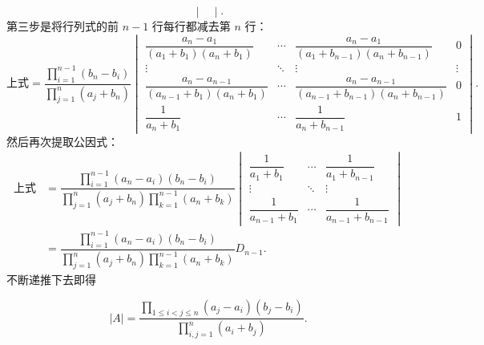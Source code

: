 \documentclass[UTF8,12pt,a4paper,fontset=fandol]{ctexart}
\begin{document}
\begin{solve}
\[\begin{vmatrix}
        \end{vmatrix}. \]
    第三步是将行列式的前 $n-1$ 行每行都减去第 $n$ 行：
    \[ \text{上式} = \dfrac{\prod\limits_{i=1}^{n-1}(b_n-b_i)}{\prod\limits_{j=1}^{n}(a_j+b_n)}
        \begin{vmatrix}
            \dfrac{a_n-a_1}{(a_1+b_1)(a_n+b_1)}         & \cdots & \dfrac{a_n-a_1}{(a_1+b_{n-1})(a_n+b_{n-1})}         & 0      \\[2ex]
            \vdots                                      & \ddots & \vdots                                              & \vdots \\[2ex]
            \dfrac{a_n-a_{n-1}}{(a_{n-1}+b_1)(a_n+b_1)} & \cdots & \dfrac{a_n-a_{n-1}}{(a_{n-1}+b_{n-1})(a_n+b_{n-1})} & 0      \\[2ex]
            \dfrac{1}{a_n+b_1}                          & \cdots & \dfrac{1}{a_n+b_{n-1}}                              & 1
        \end{vmatrix}. \]
    然后再次提取公因式：
    \begin{align*}
        \text{上式} & = \dfrac{\prod\limits_{i=1}^{n-1}(a_n-a_i)(b_n-b_i)}{\prod\limits_{j=1}^{n}(a_j+b_n)\prod\limits_{k=1}^{n-1}(a_n+b_k)}
        \begin{vmatrix}
            \dfrac{1}{a_1+b_1}     & \cdots & \dfrac{1}{a_1+b_{n-1}}     \\[2ex]
            \vdots                 & \ddots & \vdots                     \\[2ex]
            \dfrac{1}{a_{n-1}+b_1} & \cdots & \dfrac{1}{a_{n-1}+b_{n-1}}
        \end{vmatrix}                                                         \\[2ex]
                    & = \dfrac{\prod\limits_{i=1}^{n-1}(a_n-a_i)(b_n-b_i)}{\prod\limits_{j=1}^{n}(a_j+b_n)\prod\limits_{k=1}^{n-1}(a_n+b_k)} D_{n-1}.
    \end{align*}
    不断递推下去即得

    \[|A| = \dfrac{\prod\limits_{1 \leqslant i < j \leqslant n}(a_j - a_i)(b_j - b_i)}{\prod\limits_{i,j=1}^{n}(a_i + b_j)}.\]
\end{solve}
\end{document}
